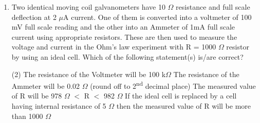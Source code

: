 
\begin{enumerate}
    \item Two identical moving coil galvanometers have 10 $\Omega$ resistance and full scale deflection at 2 $\mu$A current. One of them is converted into a voltmeter of 100 mV full scale reading and the other into an Ammeter of 1mA full scale current using appropriate resistors. These are then used to measure the voltage and current in the Ohm’s law experiment with R = 1000 $\Omega$ resistor by using an ideal cell. Which of the following statement(s) is/are correct?
        \begin{tasks}(2)
            \task The resistance of the Voltmeter will be 100 k$\Omega$
            \task The resistance of the Ammeter will be 0.02 $\Omega$ (round off to 2\textsuperscript{nd} decimal place)
            \task The measured value of R will be 978 $\Omega$ $<$ R $<$ 982 $\Omega$
            \task If the ideal cell is replaced by a cell having internal resistance of 5 $\Omega$ then the measured value of R will be more than 1000 $\Omega$
        \end{tasks}
\end{enumerate}
